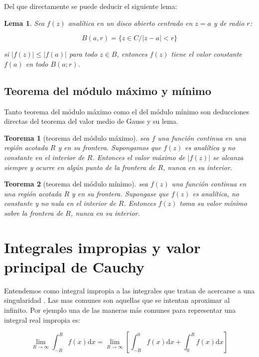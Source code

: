 \documentclass[12pt]{book}
\newcommand{\ccorchetes}[1]{\left[ #1  \right]}
\newcommand{\D}{\mathrm{d}}
\newtheorem{theorem}{Teorema}[section]
\newtheorem{lemma}{Lema}[section]
\begin{document}
Del que directamente se puede deducir el siguiente lema:

\begin{lemma}
Sea $f(z)$ analítica en un disco abierto centrado en $z=a$ y de radio $r$: 

$$ B(a,r) = \{ z \in C / |z-a|<r \} $$

si $|f(z)|\leq|f(a)|$ para todo $z \in B$, entonces $f(z)$ tiene el valor constante $f(a)$ en todo $B(a;r)$.
\end{lemma}

\subsection{Teorema del módulo máximo y mínimo}

Tanto teorema del módulo máximo como el del módulo mínimo son deducciones directas del teorema del valor medio de Gauss y su lema.
 
\begin{theorem}[teorema del módulo máximo]
sea $f$ una función continua en una  región acotada $R$ y en su frontera. Supongamos que $f(z)$ es analítica y no constante en el interior de $R$. Entonces el valor máximo de  $|f(z)|$ se alcanza siempre y ocurre en algún punto de la frontera de $R$, nunca en su interior.
\end{theorem}

\begin{theorem}[teorema del módulo mínimo]
sea $f(z)$ una función continua en una región acotada $R$ y en su frontera. Supongase que $f(z)$ es analítica, no constante y no nula en el interior de $R$. Entonces $f(z)$ toma su valor mínimo sobre la frontera de $R$, nunca en su interior.
\end{theorem}

\section{Integrales impropias y valor principal de Cauchy}

Entendemos como integral impropia a las integrales que tratan de acercarse a una singularidad . Las mas comunes son aquellas que se intentan aproximar al infinito. Por ejemplo una de las maneras más comunes para representar una integral real impropia es:

\begin{equation}
\lim_{R \rightarrow \infty} \int_{-R}^R f(x) \D x = \lim_{R \rightarrow \infty} \ccorchetes{\int_{-R}^0 f(x) \D x + \int_0^R f(x) \D x }
\end{equation}
\end{document}
